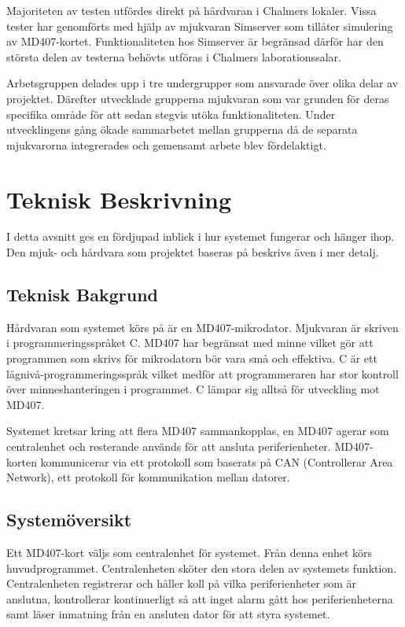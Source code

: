 \documentclass[a4paper]{article}
\begin{document}
Majoriteten av testen utfördes direkt på hårdvaran i Chalmers lokaler. Vissa tester har genomförts med hjälp av mjukvaran Simserver som tillåter simulering av MD407-kortet. Funktionaliteten hos Simserver är begränsad därför har den största delen av testerna behövts utföras i Chalmers laborationssalar.

Arbetsgruppen delades upp i tre undergrupper som ansvarade över olika delar av projektet. Därefter utvecklade grupperna mjukvaran som var grunden för deras specifika område för att sedan stegvis utöka funktionaliteten. Under utvecklingens gång ökade sammarbetet mellan grupperna då de separata mjukvarorna integrerades och gemensamt arbete blev fördelaktigt.


\section{Teknisk Beskrivning}
I detta avsnitt ges en fördjupad inblick i hur systemet fungerar och hänger ihop. Den mjuk- och hårdvara som projektet baseras på beskrivs även i mer detalj.

\subsection{Teknisk Bakgrund}
Hårdvaran som systemet körs på är en MD407-mikrodator. Mjukvaran är skriven i programmeringsspråket C. MD407 har begränsat med minne vilket gör att programmen som skrivs för mikrodatorn bör vara små och effektiva. C är ett lågnivå-programmeringsspråk vilket medför att programmeraren har stor kontroll över minneshanteringen i programmet. C lämpar sig alltså för utveckling mot MD407.

Systemet kretsar kring att flera MD407 sammankopplas, en MD407 agerar som centralenhet och resterande används för att ansluta periferienheter. MD407-korten kommunicerar via ett protokoll som baserats på CAN (Controllerar Area Network), ett protokoll för kommunikation mellan datorer.

\subsection{Systemöversikt}

Ett MD407-kort väljs som centralenhet för systemet. Från denna enhet körs huvudprogrammet. Centralenheten sköter den stora delen av systemets funktion. Centralenheten registrerar och håller koll på vilka periferienheter som är anslutna, kontrollerar kontinuerligt så att inget alarm gått hos periferienheterna samt läser inmatning från en ansluten dator för att styra systemet.
\end{document}
